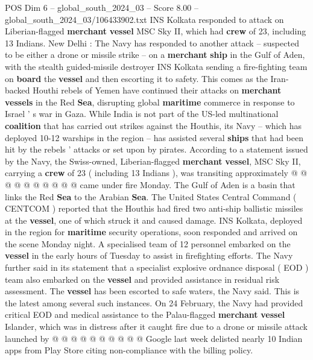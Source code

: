 \begin{textsample}{POS Dim 6 – global\_south\_2024\_03 – Score 8.00 – global\_south\_2024\_03/106433902.txt}  \label{ex:f6_pos_066}
INS Kolkata responded to attack on Liberian-flagged \textbf{merchant} \textbf{vessel} MSC Sky II, which had \textbf{crew} of 23, including 13 Indians.
New Delhi : The Navy has responded to another attack -- suspected to be either a drone or missile strike -- on a \textbf{merchant} \textbf{ship} in the Gulf of Aden, with the stealth guided-missile destroyer INS Kolkata sending a fire-fighting team on \textbf{board} the \textbf{vessel} and then escorting it to safety.
This comes as the Iran-backed Houthi rebels of Yemen have continued their attacks on \textbf{merchant} \textbf{vessels} in the Red \textbf{Sea}, disrupting global \textbf{maritime} commerce in response to Israel ' s war in Gaza.
While India is not part of the US-led multinational \textbf{coalition} that has carried out strikes against the Houthis, its Navy -- which has deployed 10-12 warships in the region -- has assisted several \textbf{ships} that had been hit by the rebels ' attacks or set upon by pirates.
According to a statement issued by the Navy, the Swiss-owned, Liberian-flagged \textbf{merchant} \textbf{vessel}, MSC Sky II, carrying a \textbf{crew} of 23 ( including 13 Indians ), was transiting approximately @ @ @ @ @ @ @ @ @ @ came under fire Monday.
The Gulf of Aden is a basin that links the Red \textbf{Sea} to the Arabian \textbf{Sea}.
The United States Central Command ( CENTCOM ) reported that the Houthis had fired two anti-ship ballistic missiles at the \textbf{vessel}, one of which struck it and caused damage.
INS Kolkata, deployed in the region for \textbf{maritime} security operations, soon responded and arrived on the scene Monday night.
A specialised team of 12 personnel embarked on the \textbf{vessel} in the early hours of Tuesday to assist in firefighting efforts.
The Navy further said in its statement that a specialist explosive ordnance disposal ( EOD ) team also embarked on the \textbf{vessel} and provided assistance in residual risk assessment.
The \textbf{vessel} has been escorted to safe waters, the Navy said.
This is the latest among several such instances.
On 24 February, the Navy had provided critical EOD and medical assistance to the Palau-flagged \textbf{merchant} \textbf{vessel} Islander, which was in distress after it caught fire due to a drone or missile attack launched by @ @ @ @ @ @ @ @ @ @ Google last week delisted nearly 10 Indian apps from Play Store citing non-compliance with the billing policy.

\end{textsample}
